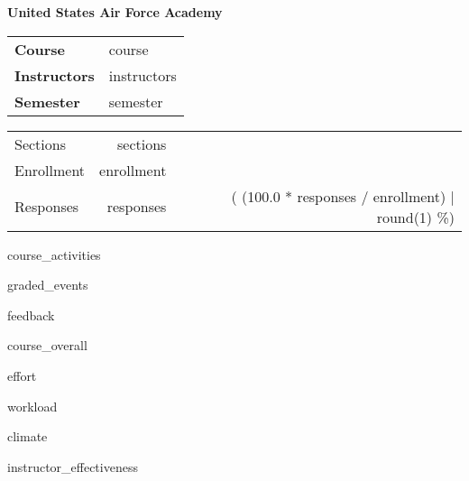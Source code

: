 \documentclass{article}
\begin{document}
{\bfseries\large United States Air Force Academy}

\smallskip  %
\begin{minipage}{0.67\linewidth}
  \begin{tabular}{@{}>{\bfseries}ll}
    Course & {{ course }}\\
    Instructors & {{ instructors }}\\
    Semester & {{ semester }}\\
  \end{tabular}
\end{minipage}%
\begin{minipage}{0.33\linewidth}
  \hfill  %
  \begin{tabular}{l rr@{}}
    Sections & {{ sections }}\\
    Enrollment & {{ enrollment }}\\
    Responses & {{ responses }} & ({{ (100.0 * responses / enrollment) | round(1) }}\%)\\
  \end{tabular}
\end{minipage}
\medskip  %

{{ course_activities }}

{{ graded_events }}

{{ feedback }}

{{ course_overall }}

{{ effort }}

\clearpage  %
{{ workload }}

{{ climate }}

{{ instructor_effectiveness }}

\end{document}
